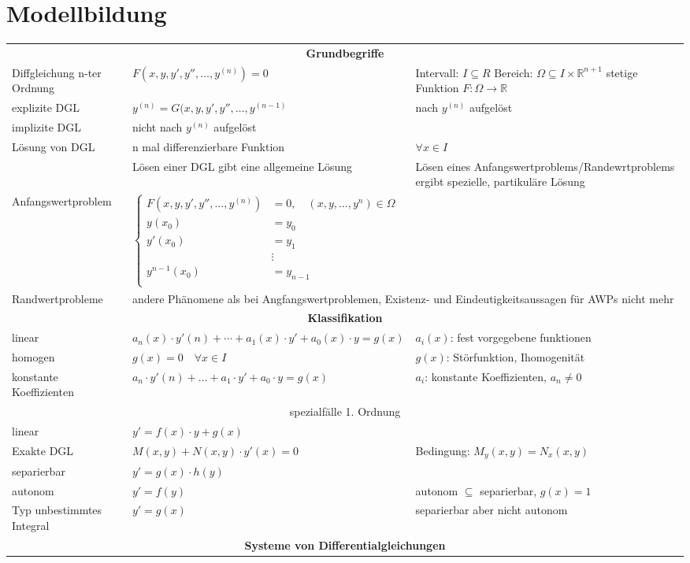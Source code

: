 
\section{Modellbildung}
\begin{tabularx}{\columnwidth}{p{2.8cm}XX}
	\hline 
	\multicolumn{3}{c}{\textbf{Grundbegriffe}}\\
	Diffgleichung n-ter Ordnung & $F(x,y,y',y'',\dots, y^{(n)}) = 0$ & 
	Intervall: $I\subseteq R$ \newline 
	Bereich: $\Omega \subseteq I \times \mathbb{R}^{n+1}$ \newline stetige Funktion $F: \Omega \rightarrow \mathbb{R}$ \\
	\hline 
	explizite  DGL &$y^{(n)} = G(x,y,y',y'',\dots,y^{(n-1)}$ & nach $y^{(n)}$ aufgelöst\\
	implizite DGL & nicht nach $y^{(n)}$ aufgelöst & \\
	\hline 
	Lösung von DGL & n mal differenzierbare Funktion &$\forall x\in I$ \\
	
	 & Lösen einer DGL gibt eine allgemeine Lösung & Lösen eines Anfangswertproblems/Randewrtproblems ergibt  spezielle, partikuläre Lösung\\
	Anfangswertproblem & $\begin{cases}
		F(x,y,y',y'',\dots, y^{(n)}) & = 0,\quad  (x,y,\dots,y^{n}) \in \Omega \\
		y(x_0)  &= y_0\\
		y'(x_0) &= y_1\\
				&\vdots \\
						y^{n-1}(x_0) &= y_{n-1}\\
	\end{cases}$& 
	\\
	Randwertprobleme & \multicolumn{2}{p{14cm}}{andere Phänomene als bei Angfangswertproblemen, Existenz- und Eindeutigkeitsaussagen für AWPs nicht mehr}\\
	\hline 
	\multicolumn{3}{c}{\textbf{Klassifikation}}\\
	linear & $a_n(x)\cdot y'(n) + \cdots + a_1(x)\cdot y' + a_0(x)\cdot y = g(x)$ & $a_i(x)$: fest vorgegebene funktionen\\
	homogen & $g(x) = 0 \quad \forall x\in I$ & $g(x)$: Störfunktion, Ihomogenität \\
	konstante Koeffizienten & $a_n\cdot y'(n) + \dots + a_1\cdot y' + a_0\cdot y = g(x)$  & $a_i$: konstante Koeffizienten, $a_n\neq 0$\\
	\multicolumn{3}{c}{spezialfälle 1. Ordnung}\\
	linear & $y' = f(x)\cdot y + g(x) $ & \\
	Exakte DGL & $M(x,y) + N(x,y)\cdot y'(x) = 0$ & Bedingung: $M_y(x,y) = N_x(x,y)$\\
	separierbar & $y' = g(x)\cdot h(y)$ & \\
	autonom & $y' = f(y)$ & autonom $\subseteq$ separierbar, $ g(x) = 1$  \\
	Typ unbestimmtes Integral & $y' = g(x)$ & separierbar aber nicht autonom\\
	\hline 
	\multicolumn{3}{c}{\textbf{Systeme von Differentialgleichungen}}\\
	

\end{tabularx}
